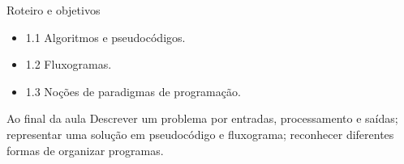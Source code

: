 \begin{frame}[t]{Roteiro e objetivos}
\begin{itemize}
\item 1.1 Algoritmos e pseudocódigos.
\item 1.2 Fluxogramas.
\item 1.3 Noções de paradigmas de programação.
\end{itemize}
\begin{block}{Ao final da aula}
Descrever um problema por entradas, processamento e saídas; representar uma solução em pseudocódigo e fluxograma; reconhecer diferentes formas de organizar programas.
\end{block}
\end{frame}
